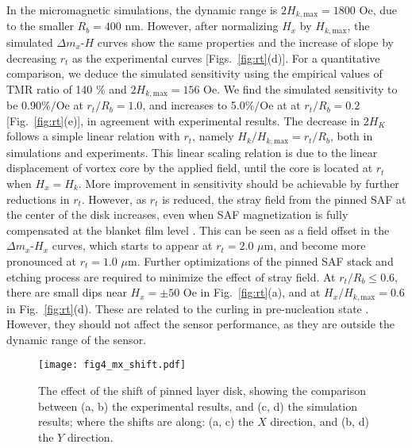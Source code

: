 \documentclass[10pt]{iopart}
\begin{document}
    In the micromagnetic simulations, the dynamic range is $2 H_{k, \mathrm{max}} = 1800$ Oe, due to the smaller $R_b = 400$ nm. However, after normalizing $H_x$ by $H_{k, \mathrm{max}}$, the simulated $\Delta m_x$-$H$ curves show the same properties and the increase of slope by decreasing $r_t$ as the experimental curves [Figs.~\ref{fig:rt}(d)]. For a quantitative comparison, we deduce the simulated sensitivity using the empirical values of TMR ratio of 140 \% and $2H_{k, \mathrm{max}} = 156$ Oe. We find the simulated sensitivity to be 0.90$\%/\mathrm{Oe}$ at $r_t/R_b = 1.0$, and increases to 5.0$\%/\mathrm{Oe}$ at at $r_t/R_b = 0.2$ [Fig.~\ref{fig:rt}(e)], in agreement with experimental results. The decrease in $2 H_K$ follows a simple linear relation with $r_t$, namely $H_k / H_{k, \mathrm{max}} = r_t / R_b$, both in simulations and experiments. This linear scaling relation is due to the linear displacement of vortex core by the applied field, until the core is located at $r_t$ when $H_x = H_k$. More improvement in sensitivity should be achievable by further reductions in $r_t$.
    {However, as $r_t$ is reduced, the stray field from the pinned SAF at the center of the disk increases, even when SAF magnetization is fully compensated at the blanket film level \cite{devolder_2019}. This can be seen as a field offset in the $\Delta m_x$-$H_x$ curves, which starts to appear at $r_t = 2.0$ $\mu$m, and become more pronounced at $r_t = 1.0$ $\mu$m. Further optimizations of the pinned SAF stack and etching process are required to minimize the effect of stray field. At $r_t/R_b \leq 0.6$, there are small dips near $H_x = \pm50$ Oe in Fig.~\ref{fig:rt}(a), and at $H_x/H_{k,\mathrm{max}} = 0.6$ in Fig.~\ref{fig:rt}(d). These are related to the curling in pre-nucleation state \cite{NoteSupp}. However, they should not affect the sensor performance, as they are outside the dynamic range of the sensor.}
    
    \begin{figure}
        \texttt{[image: fig4\_mx\_shift.pdf]}
        \caption{The effect of the shift of pinned layer disk, showing the comparison between (a, b) the experimental results, and (c, d) the simulation results; where the shifts are along: (a, c) the $X$ direction, and (b, d) the $Y$ direction.}
        \label{fig:shift}
    \end{figure}
    
\end{document}
